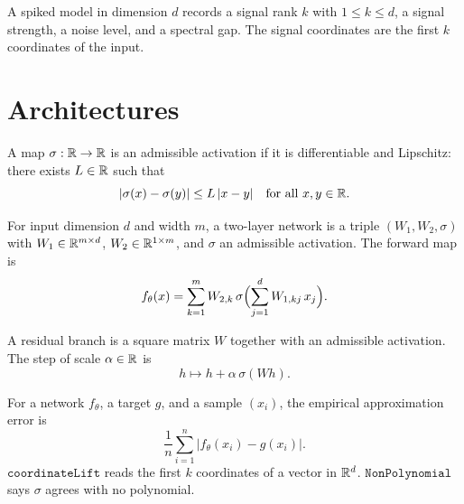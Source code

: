 \begin{definition}\label{def:spiked_model}
\leanok
{}
A spiked model in dimension $d$ records a signal rank $k$ with $1\le k\le d$, a signal strength, a noise level, and a spectral gap. The signal coordinates are the first $k$ coordinates of the input.
\end{definition}

\chapter{Architectures}

\begin{definition}\label{def:activation}
\leanok
A map $\sigma:\mathbb{R}\to\mathbb{R}$ is an admissible activation if it is differentiable and Lipschitz: there exists $L\in\mathbb{R}$ such that
\[
|\sigma(x)-\sigma(y)| \le L\,|x-y|
\quad\text{for all }x,y\in\mathbb{R}.
\]
\end{definition}

\begin{definition}\label{def:two_layer_net}
\leanok
{}
For input dimension $d$ and width $m$, a two-layer network is a triple $(W_1,W_2,\sigma)$ with $W_1\in\mathbb{R}^{m\times d}$, $W_2\in\mathbb{R}^{1\times m}$, and $\sigma$ an admissible activation. The forward map is
\[
f_\theta(x)
=
\sum_{k=1}^m W_{2,k}\,
\sigma\Bigl(\sum_{j=1}^d W_{1,kj}\,x_j\Bigr).
\]
\end{definition}

\begin{definition}\label{def:residual}
\leanok
{}
A residual branch is a square matrix $W$ together with an admissible activation. The step of scale $\alpha\in\mathbb{R}$ is
\[
h \mapsto h + \alpha\,\sigma(Wh).
\]
\end{definition}

\begin{definition}\label{def:approx_error}
\leanok
{}
For a network $f_\theta$, a target $g$, and a sample $(x_i)$, the empirical approximation error is
\[
\frac1n\sum_{i=1}^n \bigl|f_\theta(x_i)-g(x_i)\bigr|.
\]
$\mathtt{coordinateLift}$ reads the first $k$ coordinates of a vector in $\mathbb{R}^d$. $\mathtt{NonPolynomial}$ says $\sigma$ agrees with no polynomial.
\end{definition}


